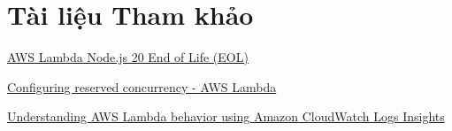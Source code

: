 \documentclass[13pt]{article}
\begin{document}
\newpage
\section{Tài liệu Tham khảo}
\begin{enumerate}[label={[\arabic*]}]
    \item \href{https://www.cloudquery.io/blog/aws-lambda-nodejs-20-eol}{AWS Lambda Node.js 20 End of Life (EOL)}
    \item \href{https://docs.aws.amazon.com/lambda/latest/dg/configuration-concurrency.html}{Configuring reserved concurrency - AWS Lambda}
    \item \href{https://aws.amazon.com/vi/blogs/mt/understanding-aws-lambda-behavior-using-amazon-cloudwatch-logs-insights/}{Understanding AWS Lambda behavior using Amazon CloudWatch Logs Insights}
\end{enumerate}
\end{document}
